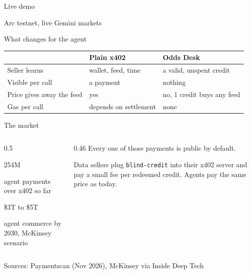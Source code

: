 \documentclass[aspectratio=169,12pt]{beamer}
\begin{document}
\begin{frame}
  \centering
  \vfill
  {\pixel\fontsize{34}{38}\selectfont\color{sand} Live demo\par}
  \medskip
  {\ttfamily\textcolor{sky}{Arc testnet, live Gemini markets}}
  \vfill
\end{frame}

\begin{frame}{What changes for the agent}
  \vspace{0.5cm}
  \small
  \renewcommand{\arraystretch}{1.25}
  \begin{tabular}{@{}>{\raggedright\arraybackslash}p{3.1cm}>{\raggedright\arraybackslash}p{3.1cm}>{\raggedright\arraybackslash}p{4.1cm}@{}}
    \toprule
    & \textcolor{sky}{Plain x402} & \textcolor{sand}{Odds Desk} \\
    \midrule
    Seller learns & wallet, feed, time & a valid, unspent credit \\
    Visible per call & a payment & nothing \\
    Price gives away the feed & yes & no, 1 credit buys any feed \\
    Gas per call & depends on settlement & none \\
    \bottomrule
  \end{tabular}
\end{frame}

\begin{frame}{The market}
  \vspace{0.7cm}
  \begin{columns}[T,onlytextwidth]
    \begin{column}{0.5\textwidth}
      {\pixel\fontsize{30}{34}\selectfont\color{sand} 254M\par}
      {\ttfamily\small\textcolor{sky}{agent payments over x402 so far}}\par
      \bigskip
      {\pixel\fontsize{30}{34}\selectfont\color{sand} \$3T to \$5T\par}
      {\ttfamily\small\textcolor{sky}{agent commerce by 2030, McKinsey scenario}}
    \end{column}
    \begin{column}{0.46\textwidth}
      Every one of those payments is public by default.
      \medskip

      Data sellers plug \texttt{blind-credit} into their x402 server and pay a small fee per redeemed credit. Agents pay the same price as today.
    \end{column}
  \end{columns}
  \vfill
  {\ttfamily\tiny\textcolor{sky}{Sources: Paymentscan (Nov 2026), McKinsey via Inside Deep Tech}}
  \vspace{0.6cm}
\end{frame}
\end{document}
